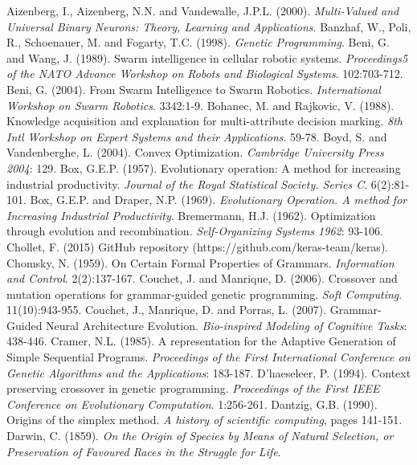 \documentclass[spanish,a4paper,12pt,twoside]{report}
\begin{document}
\begin{thebibliography}{00}
   Aizenberg, I., Aizenberg, N.N. and Vandewalle, J.P.L. (2000). \emph{Multi-Valued and Universal Binary Neurons: Theory, Learning and Applications}.
   Banzhaf, W., Poli, R., Schoenauer, M. and Fogarty, T.C. (1998). \emph{Genetic Programming}.
   Beni, G. and Wang, J. (1989). Swarm intelligence in cellular robotic systems. \emph{Proceedings5 of the NATO Advance Workshop on Robots and Biological Systems}. 102:703-712.
   Beni, G. (2004). From Swarm Intelligence to Swarm Robotics. \emph{International Workshop on Swarm Robotics}. 3342:1-9.
   Bohanec, M. and Rajkovic, V. (1988). Knowledge acquisition and explanation for multi-attribute decision marking. \emph{8th Intl Workshop on Expert Systems and their Applications}. 59-78.
   Boyd, S. and Vandenberghe, L. (2004). Convex Optimization. \emph{Cambridge University Press 2004}: 129.
   Box, G.E.P. (1957). Evolutionary operation: A method for increasing industrial productivity. \emph{Journal of the Royal Statistical Society. Series C}. 6(2):81-101.
   Box, G.E.P. and Draper, N.P. (1969). \emph{Evolutionary Operation. A method for Increasing Industrial Productivity}.
   Bremermann, H.J. (1962). Optimization through evolution and recombination. \emph{Self-Organizing Systems 1962}: 93-106.
   Chollet, F. (2015) GitHub repository (https://github.com/keras-team/keras).
   Chomsky, N. (1959). On Certain Formal Properties of Grammars. \emph{Information and Control}. 2(2):137-167.
   Couchet, J. and Manrique, D. (2006). Crossover and mutation operations for grammar-guided genetic programming. \emph{Soft Computing}. 11(10):943-955.
   Couchet, J., Manrique, D. and Porras, L. (2007). Grammar-Guided Neural Architecture Evolution. \emph{Bio-inspired Modeling of Cognitive Tasks}: 438-446.
   Cramer, N.L. (1985). A representation for the Adaptive Generation of Simple Sequential Programs. \emph{Proceedings of the First International Conference on Genetic Algorithms and the Applications}: 183-187.
   D'haeseleer, P. (1994). Context preserving crossover in genetic programming. \emph{Proceedings of the First IEEE Conference on Evolutionary Computation}. 1:256-261.
   Dantzig, G.B. (1990). Origins of the simplex method. \emph{A history of scientific computing}, pages 141-151.
   Darwin, C. (1859). \emph{On the Origin of Species by Means of Natural Selection, or Preservation of Favoured Races in the Struggle for Life}. 

\end{thebibliography}
\end{document}

